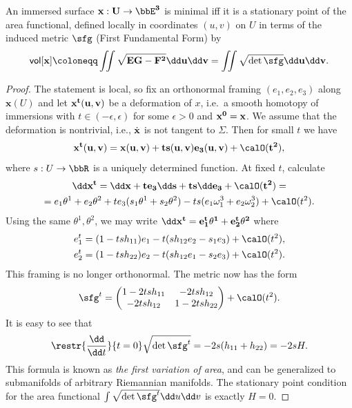 \begin{prop}
    An immersed surface $\bf{x}:U\to \bbE^3$ is minimal iff it is a stationary point of the area functional, defined locally in coordinates $(u,v)$ on $U$ in terms of the induced metric $\sfg$ (First Fundamental Form) by
    \[\mathsf{vol}[\bf{x}]\coloneqq \iint \sqrt{EG-F^2}\dd u\dd v=\iint \sqrt{\det\sfg}\dd u\dd v.\]
\end{prop}
\begin{proof}
    The statement is local, so fix an orthonormal framing $(e_1,e_2,e_3)$ along $\bm{x}(U)$ and let $\bf{x}^t(u,v)$ be a deformation of $x$, i.e.~a smooth homotopy of immersions with $t\in (-\epsilon,\epsilon)$ for some $\epsilon>0$ and $\bf{x}^0=\bf{x}$. We assume that the deformation is nontrivial, i.e., $\dot{\bf{x}}$ is not tangent to $\Sigma$. Then for small $t$ we have 
    \[\bf{x}^t(u,v)=\bf{x}(u,v)+t s(u,v)e_3(u,v)+\calO(t^2),\]
    where $s:U\to \bbR$ is a uniquely determined function. At fixed $t$, calculate 
    \begin{multline}
        \dd \bf{x}^t=\dd\bf{x}+te_3\dd s+ts\dd e_3+\calO(t^2)=\\
        =e_1\theta^1+e_2\theta^2+te_3(s_1\theta^1+s_2\theta^2)-ts(e_1\omega_1^3+e_2\omega_2^3)+\calO(t^2).
    \end{multline}
    Using the same $\theta^1,\theta^2$, we may write $\dd\bf{x}^t=e_1^t\theta^1+e_2^t\theta^2$ where 
    \begin{align}
        e_1^t&= (1-tsh_{11})e_1-t(sh_{12}e_2-s_1e_3)+\calO(t^2),\\
        e_2^t&= (1-tsh_{22})e_2-t(sh_{12}e_1-s_2e_3)+\calO(t^2).
    \end{align}
    This framing is no longer orthonormal. The metric now has the form 
    \[\sfg^t=\begin{pmatrix}
        1-2tsh_{11} & -2tsh_{12}\\
        -2tsh_{12} & 1-2tsh_{22}
    \end{pmatrix}+\calO(t^2).\]
    It is easy to see that
    \[\restr{\frac{\dd}{\dd t}}{t=0}\sqrt{\det \sfg^t}=-2s(h_{11}+h_{22})=-2sH.\]
    This formula is known as \emph{the first variation of area}, and can be generalized to submanifolds of arbitrary Riemannian manifolds. The stationary point condition for the area functional $\int \sqrt{\det\sfg^t}\dd u\dd v$ is exactly $H=0$.
\end{proof}

